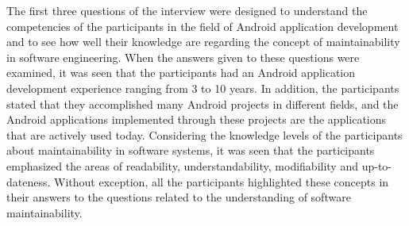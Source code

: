 The first three questions of the interview were designed to understand the competencies of the participants in the field of Android application development and to see how well their knowledge are regarding the concept of maintainability in software engineering. When the answers given to these questions were examined, it was seen that the participants had an Android application development experience ranging from 3 to 10 years. In addition, the participants stated that they accomplished many Android projects in different fields, and the Android applications implemented through these projects are the applications that are actively used today. Considering the knowledge levels of the participants about maintainability in software systems, it was seen that the participants emphasized the areas of readability, understandability, modifiability and up-to-dateness. Without exception, all the participants highlighted these concepts in their answers to the questions related to the understanding of software maintainability.